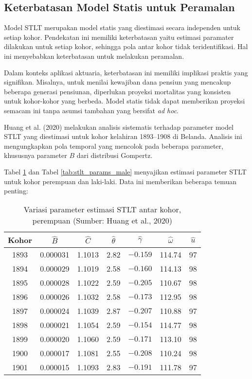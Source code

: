 \subsection{Keterbatasan Model Statis untuk Peramalan}

Model STLT merupakan model statis yang diestimasi secara independen untuk setiap kohor. Pendekatan ini memiliki keterbatasan yaitu estimasi paramater dilakukan untuk setiap kohor, sehingga pola antar kohor tidak teridentifikasi. Hal ini menyebabkan keterbatasan untuk melakukan peramalan.

Dalam konteks aplikasi aktuaria, keterbatasan ini memiliki implikasi praktis yang signifikan. Misalnya, untuk menilai kewajiban dana pensiun yang mencakup beberapa generasi pensiunan, diperlukan proyeksi mortalitas yang konsisten untuk kohor-kohor yang berbeda. Model statis tidak dapat memberikan proyeksi semacam ini tanpa asumsi tambahan yang bersifat \textit{ad hoc}.

Huang et al. (2020) melakukan analisis sistematis terhadap parameter model STLT yang diestimasi untuk kohor kelahiran 1893--1908 di Belanda. Analisis ini mengungkapkan pola temporal yang mencolok pada beberapa parameter, khususnya parameter $B$ dari distribusi Gompertz.

Tabel \ref{tab:stlt_params_female} dan Tabel \ref{tab:stlt_params_male} menyajikan estimasi parameter STLT untuk kohor perempuan dan laki-laki. Data ini memberikan beberapa temuan penting:

\begin{table}[H]
\centering
\caption{Variasi parameter estimasi STLT antar kohor, perempuan (Sumber: Huang et al., 2020)}
\label{tab:stlt_params_female}
\begin{tabular}{ccccccc}
\hline
Kohor & $\hat{B}$ & $\hat{C}$ & $\hat{\theta}$ & $\hat{\gamma}$ & $\hat{\omega}$ & $\hat{u}$ \\
\hline
1893 & 0.000031 & 1.1013 & 2.82 & $-0.159$ & 114.74 & 97 \\
1894 & 0.000029 & 1.1019 & 2.58 & $-0.160$ & 114.13 & 98 \\
1895 & 0.000028 & 1.1022 & 2.59 & $-0.205$ & 110.67 & 98 \\
1896 & 0.000026 & 1.1032 & 2.58 & $-0.173$ & 112.95 & 98 \\
1897 & 0.000024 & 1.1039 & 2.87 & $-0.207$ & 110.88 & 97 \\
1898 & 0.000021 & 1.1054 & 2.59 & $-0.154$ & 114.77 & 98 \\
1899 & 0.000020 & 1.1060 & 2.59 & $-0.171$ & 113.10 & 98 \\
1900 & 0.000017 & 1.1081 & 2.55 & $-0.208$ & 110.24 & 98 \\
1901 & 0.000015 & 1.1093 & 2.83 & $-0.191$ & 111.78 & 97 \\
\hline
\end{tabular}
\end{table}

